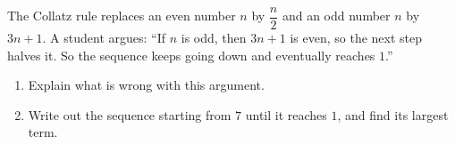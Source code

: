 The Collatz rule replaces an even number $n$ by $\dfrac n2$ and an odd number $n$ by $3n+1$. A student argues: ``If $n$ is odd, then $3n+1$ is even, so the next step halves it. So the sequence keeps going down and eventually reaches $1$.''
\begin{enumerate}
\item[(a)] Explain what is wrong with this argument.
\item[(b)] Write out the sequence starting from $7$ until it reaches $1$, and find its largest term.
\end{enumerate}
